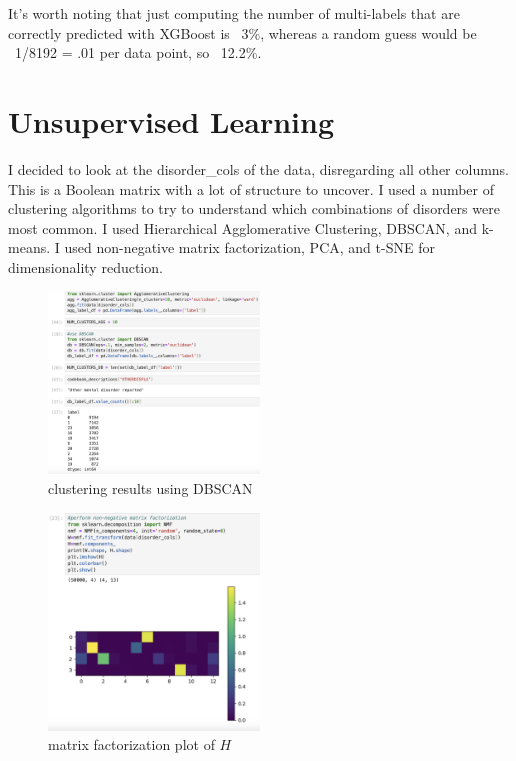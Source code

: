 \documentclass[11pt]{amsart}
\begin{document}
It's worth noting that just computing the number of multi-labels that are correctly predicted with XGBoost is ~3\%, whereas a random guess would be ~1/8192 = .01 per data point, so ~12.2\%.

\section{Unsupervised Learning}

I decided to look at the disorder\_cols of the data, disregarding all other columns. This is a Boolean matrix with a lot of structure to uncover. I used a number of clustering algorithms to try to understand which combinations of disorders were most common. I used Hierarchical Agglomerative Clustering, DBSCAN, and k-means. I used non-negative matrix factorization, PCA, and t-SNE for dimensionality reduction.

\begin{figure}[h]
\caption{clustering results using DBSCAN}
\centering
\includegraphics[width=0.5\textwidth]{clustering_techniques.png}
\end{figure}

\begin{figure}[h]
\caption{matrix factorization plot of $H$}
\centering
\includegraphics[width=0.5\textwidth]{matrix_factorization.png}
\end{figure}
\end{document}
